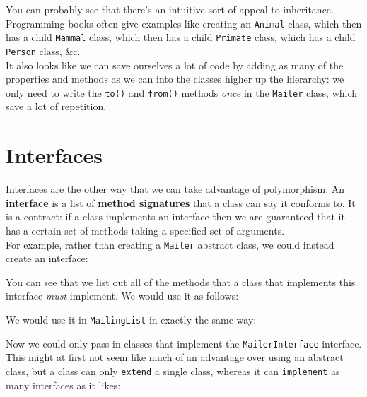 You can probably see that there's an intuitive sort of appeal to inheritance. Programming books often give examples like creating an \texttt{Animal} class, which then has a child \texttt{Mammal} class, which then has a child \texttt{Primate} class, which has a child \texttt{Person} class, \&c.
\\

It also looks like we can save ourselves a lot of code by adding as many of the properties and methods as we can into the classes higher up the hierarchy: we only need to write the \texttt{to()} and \texttt{from()} methods \textit{once} in the \texttt{Mailer} class, which save a lot of repetition.





\section{Interfaces}

Interfaces are the other way that we can take advantage of polymorphism. An \textbf{interface} is a list of \textbf{method signatures} that a class can say it conforms to. It is a contract: if a class implements an interface then we are guaranteed that it has a certain set of methods taking a specified set of arguments.
\\

For example, rather than creating a \texttt{Mailer} abstract class, we could instead create an interface:


You can see that we list out all of the methods that a class that implements this interface \textit{must} implement. We would use it as follows:


We would use it in \texttt{MailingList} in exactly the same way:


Now we could only pass in classes that implement the \texttt{MailerInterface} interface.
\\

This might at first not seem like much of an advantage over using an abstract class, but a class can only \texttt{extend} a single class, whereas it can \texttt{implement} as many interfaces as it likes:



